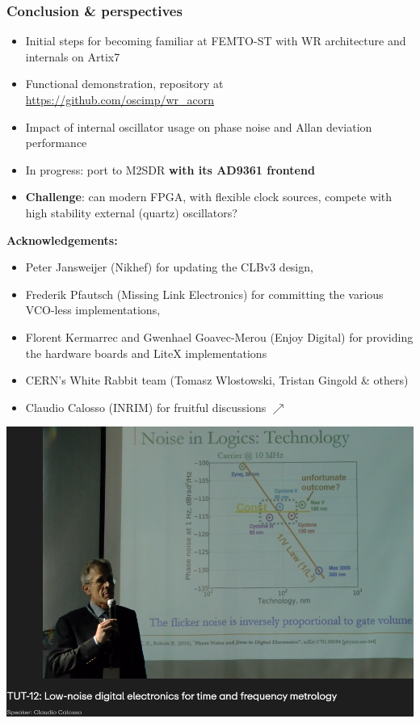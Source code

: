 \documentclass[compress,10pt,aspectratio=169]{beamer}
\begin{document}
\begin{frame}[fragile]\frametitle{Conclusion \& perspectives}

\vspace{.11cm}
\begin{minipage}[t]{\linewidth}
\begin{minipage}{.55\linewidth}
{\footnotesize
\begin{itemize}
\item Initial steps for becoming familiar at FEMTO-ST with WR architecture and internals on Artix7
\item Functional demonstration, repository at \url{https://github.com/oscimp/wr_acorn}
\item Impact of internal oscillator usage on phase noise and Allan deviation performance
\item In progress: port to M2SDR {\bf with its AD9361 frontend}
\item {\bf Challenge}: can modern FPGA, with flexible clock sources, compete with high stability external (quartz)
oscillators?
\end{itemize}

\vspace{.11cm}
{\bf Acknowledgements:}
\begin{itemize}
    \item Peter Jansweijer (Nikhef) for updating the CLBv3 design, 
    \item Frederik Pfautsch (Missing Link Electronics) for committing the various VCO-less implementations, 
    \item Florent Kermarrec and Gwenhael Goavec-Merou (Enjoy Digital) for providing the
    hardware boards and LiteX implementations
    \item CERN's White Rabbit team (Tomasz Wlostowski, Tristan Gingold \& others) 
    \item Claudio Calosso (INRIM) for fruitful discussions $\nearrow$
    \end{itemize}
}
\end{minipage}
\begin{minipage}{.495\linewidth}
\includegraphics[width=\linewidth]{figures/2025-05-26-093826_2704x1050_scrot.png}


\end{minipage}
\end{minipage}
\end{frame}
\end{document}
